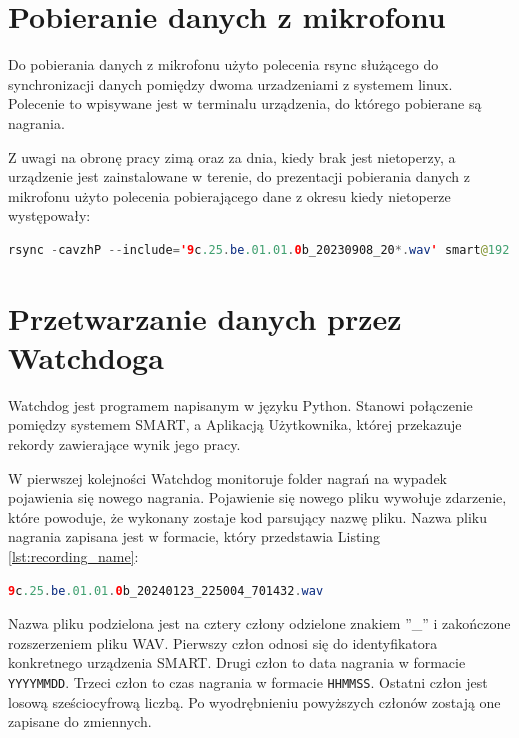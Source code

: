 \documentclass{sprz}
\begin{document}
\section{Pobieranie danych z mikrofonu}
Do pobierania danych z mikrofonu użyto polecenia rsync służącego do synchronizacji danych pomiędzy dwoma urzadzeniami z systemem linux. Polecenie to wpisywane jest w terminalu urządzenia, do którego pobierane są nagrania.

Z uwagi na obronę pracy zimą oraz za dnia, kiedy brak jest nietoperzy, a urządzenie jest zainstalowane w terenie, do prezentacji pobierania danych z mikrofonu użyto polecenia pobierającego dane z okresu kiedy nietoperze występowały:

\begin{lstlisting}[language=Java,caption={Polecenie rsync pobierające dane z pewnego okresu czasu}, label={lst:rsync_command}]
  rsync -cavzhP --include='9c.25.be.01.01.0b_20230908_20*.wav' smart@192.168.3.2:/var/www/html/storage/devices/9c.25.be.01.01.0b/data/wav/ /home/batmonit/batmonit/recordings/
\end{lstlisting}

\section{Przetwarzanie danych przez Watchdoga}

Watchdog jest programem napisanym w języku Python. Stanowi połączenie pomiędzy systemem SMART, a Aplikacją Użytkownika, której przekazuje rekordy zawierające wynik jego pracy.

W pierwszej kolejności Watchdog monitoruje folder nagrań na wypadek pojawienia się nowego nagrania. Pojawienie się nowego pliku wywołuje zdarzenie, które powoduje, że wykonany zostaje kod parsujący nazwę pliku. Nazwa pliku nagrania zapisana jest w formacie, który przedstawia Listing \ref{lst:recording_name}:

\begin{lstlisting}[language=Java,caption={Przykładowa nazwa pliku nagrania}, label={lst:recording_name}]
  9c.25.be.01.01.0b_20240123_225004_701432.wav
\end{lstlisting}

Nazwa pliku podzielona jest na cztery człony odzielone znakiem ”\_” i zakończone rozszerzeniem pliku WAV. Pierwszy człon odnosi się do identyfikatora konkretnego urządzenia SMART. Drugi człon to data nagrania w formacie \verb|YYYYMMDD|. Trzeci człon to czas nagrania w formacie \verb|HHMMSS|. Ostatni człon jest losową sześciocyfrową liczbą. Po wyodrębnieniu powyższych członów zostają one zapisane do zmiennych.
\end{document}
